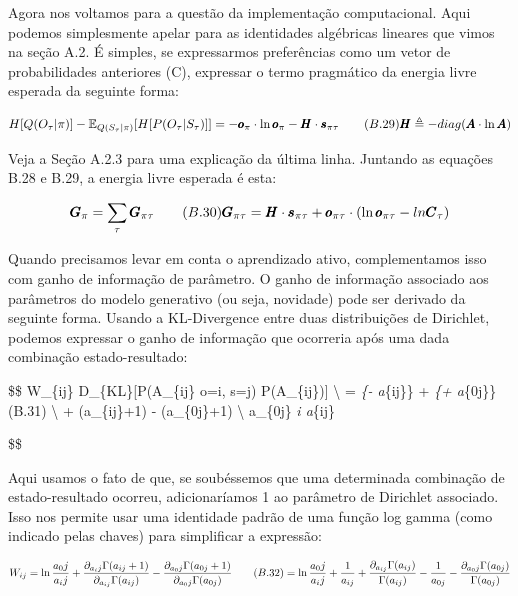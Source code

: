 \documentclass[
  12pt,
]{book}
\begin{document}
Agora nos voltamos para a questão da implementação computacional. Aqui podemos simplesmente apelar para as identidades algébricas lineares que vimos na seção A.2. É simples, se expressarmos preferências como um vetor de probabilidades anteriores (C), expressar o termo pragmático da energia livre esperada da seguinte forma:

\[H[Q(O_\tau|\pi)] - \mathbb E_{Q(S_\tau|\pi)}[H[P(O_\tau|S_\tau)]] \\
=-\pmb o_\pi \cdot \ln \pmb o_\pi - \pmb H \cdot \pmb s_{\pi\tau} \qquad (B.29) \\
\pmb H \triangleq - diag(\pmb A \cdot \ln \pmb A)
\]

Veja a Seção A.2.3 para uma explicação da última linha. Juntando as equações B.28 e B.29, a energia livre esperada é esta:

\[
\pmb G_\pi = \sum_\tau \pmb G_{\pi\tau}  \qquad (B.30)\\
\pmb G_{\pi\tau} = \pmb H \cdot \pmb s_{\pi\tau} + \pmb o_{\pi\tau} \cdot(\ln \pmb o_{\pi\tau}- ln \pmb C_\tau)
\]

Quando precisamos levar em conta o aprendizado ativo, complementamos isso com ganho de informação de parâmetro. O ganho de informação associado aos parâmetros do modelo generativo (ou seja, novidade) pode ser derivado da seguinte forma. Usando a KL-Divergence entre duas distribuições de Dirichlet, podemos expressar o ganho de informação que ocorreria após uma dada combinação estado-resultado:

\$\$
W\_\{ij\} \triangleq D\_\{KL\}{[}P(A\_\{ij\} \textbar{} o=i, s=j) \textbar\textbar{} P(A\_\{ij\}){]} \textbackslash{}
= \emph{\{- \ln a}\{ij\}\} + \emph{\{+ \ln a}\{0j\}\} \qquad (B.31) \textbackslash{}
+ \psi(a\_\{ij\}+1) - \psi(a\_\{0j\}+1) \textbackslash{}
a\_\{0j\} \triangleq \sum\emph{i a}\{ij\}

\$\$

Aqui usamos o fato de que, se soubéssemos que uma determinada combinação de estado-resultado ocorreu, adicionaríamos 1 ao parâmetro de Dirichlet associado. Isso nos permite usar uma identidade padrão de uma função log gamma (como indicado pelas chaves) para simplificar a expressão:

\[
W_{ij}=\ln \frac{a_0j}{a_ij} + \frac{\partial_{a_ij} \Gamma(a_{ij} + 1)}{\partial_{a_{ij}} \Gamma(a_{ij})} - \frac{\partial_{a_0j} \Gamma(a_{0j} + 1)}{\partial_{a_0j} \Gamma(a_{0j})} \qquad (B.32) \\
= \ln \frac{a_0j}{a_ij} + \frac{1}{a_{ij}} + \frac{\partial_{a_{ij}} \Gamma(a_{ij})}{\Gamma(a_{ij})} - \frac{1}{a_{0j}} - \frac{\partial_{a_0j} \Gamma(a_{0j} )}{\Gamma(a_{0j})}
\]
\end{document}

